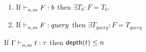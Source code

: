 \documentclass{article}
\begin{document}
\clearpage


\begin{lemma} $ $
	\label{lem:1}
    \begin{enumerate}
\item If $\mathrel{\vdash_{n,m}^{} {F} : {b}} $ then $ \exists T_{b} : F = T_{b}$.\\
\item If $\mathrel{\vdash_{n,m}^{} {F} : {query}} $ then $ \exists T_{query} : F = T_{query}$
\end{enumerate}
	
	
\end{lemma}

\clearpage
\begin{lemma} 
	\label{lem:2}
	If $\Gamma \mathrel{\vdash_{n,m}^{} {t} : {\tau}} $ then $\mathsf{depth}(t) \leq n$\\
\end{lemma}
\end{document}
